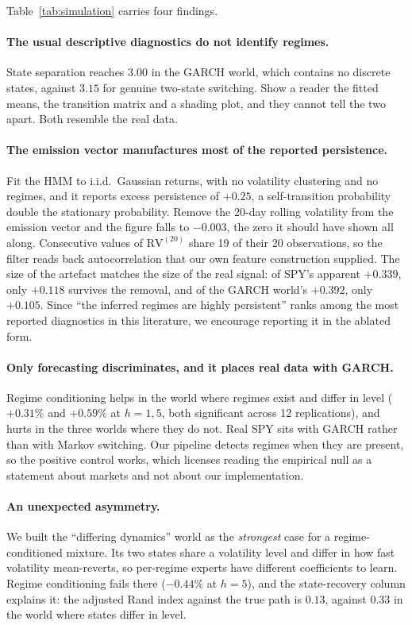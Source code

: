 \documentclass[sigconf,nonacm]{acmart}
\begin{document}
Table~\ref{tab:simulation} carries four findings.

\paragraph{The usual descriptive diagnostics do not identify regimes.}
State separation reaches $3.00$ in the GARCH world, which contains no discrete
states, against $3.15$ for genuine two-state switching. Show a reader the fitted
means, the transition matrix and a shading plot, and they cannot tell the two
apart. Both resemble the real data.

\paragraph{The emission vector manufactures most of the reported persistence.}
Fit the HMM to i.i.d.\ Gaussian returns, with no
volatility clustering and no regimes, and it reports excess persistence of
$+0.25$, a self-transition probability double the stationary probability. Remove
the 20-day rolling volatility from the emission vector and the figure falls to
$-0.003$, the zero it should have shown all along. Consecutive values of
$\mathrm{RV}^{(20)}$ share 19 of their 20 observations, so the filter reads back
autocorrelation that our own feature construction supplied. The size of the
artefact matches the size of the real signal: of SPY's apparent $+0.339$, only
$+0.118$ survives the removal, and of the GARCH world's $+0.392$, only $+0.105$.
Since ``the inferred regimes are highly persistent'' ranks among the most
reported diagnostics in this literature, we encourage reporting it in the ablated
form.

\paragraph{Only forecasting discriminates, and it places real data with GARCH.}
Regime conditioning helps in the world where regimes exist and differ in level
($+0.31\%$ and $+0.59\%$ at $h=1,5$, both significant across 12 replications),
and hurts in the three worlds where they do not. Real SPY sits with GARCH rather
than with Markov switching. Our pipeline detects regimes when they are present,
so the positive control works, which licenses reading the empirical null as a
statement about markets and not about our implementation.

\paragraph{An unexpected asymmetry.} We built the ``differing dynamics'' world as
the \emph{strongest} case for a regime-conditioned mixture. Its two states share a
volatility level and differ in how fast volatility mean-reverts, so per-regime
experts have different coefficients to learn. Regime conditioning fails there
($-0.44\%$ at $h=5$), and the state-recovery column explains it: the adjusted Rand
index against the true path is $0.13$, against $0.33$ in the world where states
differ in level.
\end{document}
